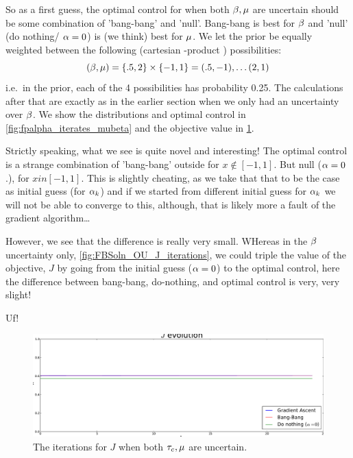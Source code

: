 So as a first guess, the optimal control for when both $\beta,{\mu }$ are uncertain
should be some combination of 'bang-bang' and 'null'. Bang-bang is best for $\beta$
and 'null' (do nothing/ $\alpha=0$) is (we think) best for ${\mu }$.
We let the prior be equally weighted between the following (cartesian
-product ) possibilities:
$$
(\beta, {\mu }) =\{.5, 2\} \times \{-1,1\} = (.5,-1), \ldots (2,1)
$$
i.e.\ in the prior, each of the 4 possibilities has probability
0.25. The calculations after that are exactly as in the earlier section when we only had
an uncertainty over $\beta$. We show the distributions and optimal control in
\cref{fig:fpalpha_iterates_mubeta} and the objective value in
\cref{fig:OU_mubeta_Jiterates}. 

Strictly speaking, what we see is quite novel and interesting! The optimal
control is a strange combination of 'bang-bang' outside for  $x \notin [-1,1]$.
But null ($\alpha=0$.), for $x in [-1,1]$. This is slightly cheating, as we take
that that to be the case as initial guess (for $\alpha_k$) and if we started from
different initial guess for $\alpha_k$ we will not be able to converge to this,
although, that is likely more a fault of the gradient algorithm\ldots

However, we see that the difference is really very small. WHereas in the $\beta$
uncertainty only,   \cref{fig:FBSoln_OU_J_iterations}, we could triple the value
of the objective, $J$ by going from the initial guess ($\alpha=0$) to the optimal
control, here the difference between bang-bang, do-nothing, and optimal control
is very, very slight!

Uf!


\begin{figure}[htp]
\begin{center}
  \includegraphics[width=1\textwidth]{Figs/OUFBSolver_BetaMu/FB_J_iterates_uICs_Tf=2.pdf}
  \caption[tableofCs]{The iterations for $J$ when both ${ \tau_{c} }, {\mu }$ are
  uncertain.}
  \label{fig:OU_mubeta_Jiterates}
\end{center}
\end{figure}

